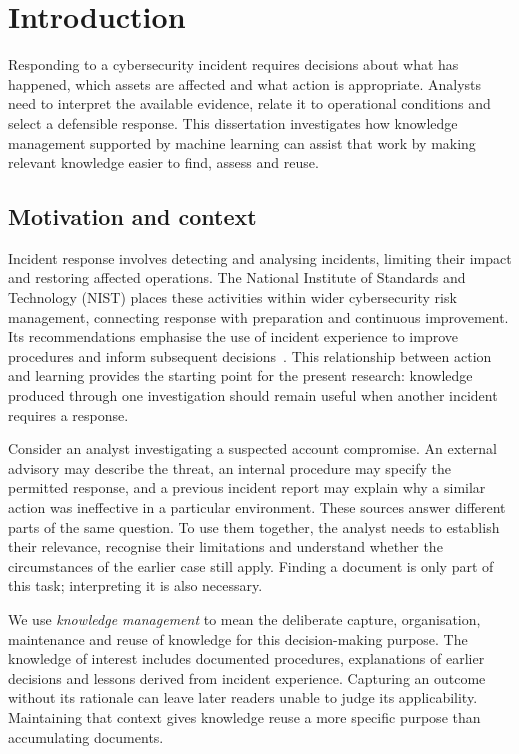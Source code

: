 \chapter{Introduction}\label{ch:introduction}

Responding to a cybersecurity incident requires decisions about what has happened, which assets are affected and what action is appropriate. Analysts need to interpret the available evidence, relate it to operational conditions and select a defensible response. This dissertation investigates how knowledge management supported by machine learning can assist that work by making relevant knowledge easier to find, assess and reuse.

\section{Motivation and context}
Incident response involves detecting and analysing incidents, limiting their impact and restoring affected operations. The National Institute of Standards and Technology (NIST) places these activities within wider cybersecurity risk management, connecting response with preparation and continuous improvement. Its recommendations emphasise the use of incident experience to improve procedures and inform subsequent decisions~\cite{nist2025incident}. This relationship between action and learning provides the starting point for the present research: knowledge produced through one investigation should remain useful when another incident requires a response.

Consider an analyst investigating a suspected account compromise. An external advisory may describe the threat, an internal procedure may specify the permitted response, and a previous incident report may explain why a similar action was ineffective in a particular environment. These sources answer different parts of the same question. To use them together, the analyst needs to establish their relevance, recognise their limitations and understand whether the circumstances of the earlier case still apply. Finding a document is only part of this task; interpreting it is also necessary.

We use \emph{knowledge management} to mean the deliberate capture, organisation, maintenance and reuse of knowledge for this decision-making purpose. The knowledge of interest includes documented procedures, explanations of earlier decisions and lessons derived from incident experience. Capturing an outcome without its rationale can leave later readers unable to judge its applicability. Maintaining that context gives knowledge reuse a more specific purpose than accumulating documents.

